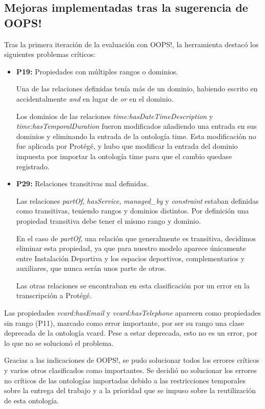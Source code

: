 \documentclass[a4paper,12pt]{article}
\begin{document}
	\subsection{Mejoras implementadas tras la sugerencia de OOPS!}
	
	Tras la primera iteración de la evaluación con OOPS!, la herramienta destacó los siguientes problemas críticos:
	
	\begin{itemize}
		\item \textbf{P19:} Propiedades con múltiples rangos o dominios.
		
		Una de las relaciones definidas tenía más de un dominio, habiendo escrito en  accidentalmente \textit{and} en lugar de \textit{or} en el dominio.
		
		Los dominios de las relaciones \textit{time:hasDateTimeDescription} y \textit{time:hasTemporalDuration} fueron modificados añadiendo una entrada en sus dominios y eliminando la entrada de la ontología time. Esta modificación no fue aplicada por Protégé, y hubo que modificar la entrada del dominio impuesta por importar la ontología time para que el cambio quedase registrado.
		
		\item \textbf{P29:} Relaciones transitivas mal definidas.
		
		Las relaciones \textit{partOf}, \textit{hasService}, \textit{managed\_by} y \textit{constraint} estaban definidas como transitivas, teniendo rangos y dominios distintos. Por definición una propiedad transitiva debe tener el mismo rango y dominio.
		
		En el caso de \textit{partOf}, una relación que generalmente es transitiva, decidimos eliminar esta propiedad, ya que para nuestro modelo aparece únicamente entre Instalación Deportiva y los espacios deportivos, complementarios y auxiliares, que nunca serán unos parte de otros.
		
		Las otras relaciones se encontraban en esta clasificación por un error en la transcripción a Protégé.
	\end{itemize}
	
	Las propiedades \textit{vcard:hasEmail} y \textit{vcard:hasTelephone} aparecen como propiedades sin rango (P11), marcado como error importante, por ser su rango una clase deprecada de la ontología vcard. Pese a estar deprecada, esto no es un error, por lo que no se solucionó el problema.
	
	Gracias a las indicaciones de OOPS!, se pudo solucionar todos los errores críticos y varios otros clasificados como importantes. Se decidió no solucionar los errores no críticos de las ontologías importadas debido a las restricciones temporales sobre la entrega del trabajo y a la prioridad que se impuso sobre la reutilización de esta ontología.
	
\end{document}
